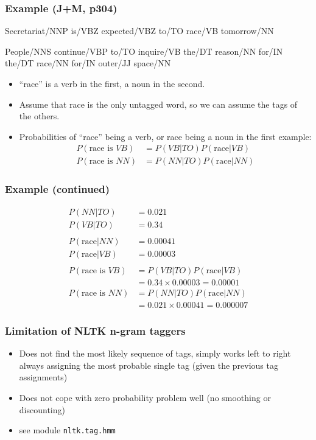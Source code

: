 \begin{frame}[fragile]\frametitle{Example (J+M, p304)}
  {\small
  Secretariat/NNP is/VBZ expected/VBZ to/TO \alert{race/VB} tomorrow/NN

  \medskip
  People/NNS continue/VBP to/TO inquire/VB the/DT reason/NN for/IN the/DT
  \alert{race/NN} for/IN outer/JJ space/NN
  }

  \begin{itemize}
  \item``race'' is a verb in the first, a noun in the second.
  \item Assume that race is the only untagged word, so we can assume
    the tags of the others.
  \item Probabilities of ``race'' being a verb, or race being a noun
    in the first example:
    \begin{align*}
      P(\mbox{race is }VB) &= P(VB|TO) P(\mbox{race}|VB) \\
      P(\mbox{race is }NN) &= P(NN|TO) P(\mbox{race}|NN) 
    \end{align*}
  \end{itemize}
\end{frame}

\begin{frame}[fragile]\frametitle{Example (continued)}
  \begin{align*}
    P(NN|TO) &= 0.021 \\
    P(VB|TO) &= 0.34 \\
    \\
    P(\mbox{race}|NN) &= 0.00041\\
    P(\mbox{race}|VB) &= 0.00003\\
    \\
    P(\mbox{race is }VB) &= P(VB|TO) P(\mbox{race}|VB) \\
    &= 0.34 \times 0.00003 = 0.00001 \\
    P(\mbox{race is }NN) &= P(NN|TO) P(\mbox{race}|NN) \\
    &= 0.021 \times 0.00041 = 0.000007
   \end{align*}
\end{frame}

\begin{frame}[fragile]\frametitle{Limitation of NLTK n-gram taggers}

  \begin{itemize}
  \item Does not find the most likely sequence of tags, simply works
    left to right always assigning the most probable single tag (given
    the previous tag assignments)
  \item Does not cope with zero probability problem well (no smoothing
    or discounting)
  \item see module \verb|nltk.tag.hmm|
  \end{itemize}
\end{frame}

